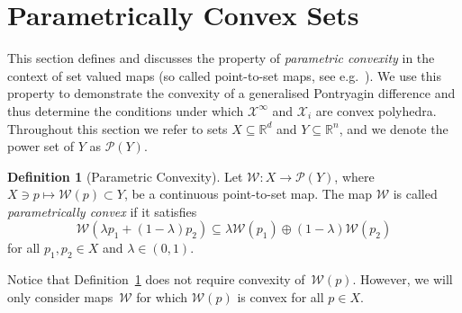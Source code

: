 \documentclass[journal]{IEEEtran}
\newcounter{thmcount}
\theoremstyle{remark}
\theoremstyle{definition}
\newtheorem{defi}[thmcount]{Definition}
\begin{document}
\section{Parametrically Convex Sets}\label{sec:p:convex:sets}
This section defines and discusses the property of \emph{parametric convexity} in the context of set valued maps (so called point-to-set maps, see e.g.~\cite{Hogan:1973}). We use this property 
to demonstrate the convexity of a generalised Pontryagin difference and thus determine the conditions under which $\mathcal{X}^\infty$ and $\mathcal{X}_i$ are convex polyhedra. 
%
Throughout this section we refer to sets $X\subseteq\mathbb R^d$ and $Y\subseteq\mathbb R^n$, and we denote the power set of $Y$ as $\mathscr P(Y)$.
%
\begin{defi}[Parametric Convexity]\label{def:parametric:convexity}
Let $\mathcal W:X\rightarrow \mathscr P(Y)$, where $X\ni p\mapsto \mathcal W(p) \subset Y$, be a continuous point-to-set map. The map $\mathcal W$ is called \emph{parametrically convex} if it satisfies
%
  \begin{equation}\label{eq:def:parametrically:convex}
  \mathcal W(\lambda p_1 + (1-\lambda)p_2)\subseteq\lambda \mathcal W(p_1) \oplus (1-\lambda) \mathcal W(p_2)
  \end{equation}
%
  for all $p_1,p_2\in X$ and $\lambda\in (0,1)$.
\end{defi}
%
Notice that Definition~\ref{def:parametric:convexity} does not require convexity of~$\mathcal W(p)$. However, we will only consider maps~$\mathcal W$ for which $\mathcal W(p)$ is convex for all $p\in X$.
\end{document}
